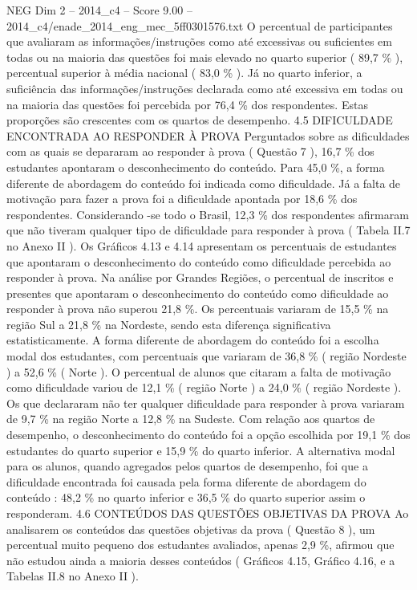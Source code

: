 \begin{textsample}{NEG Dim 2 – 2014\_c4 – Score 9.00 – 2014\_c4/enade\_2014\_eng\_mec\_5ff0301576.txt}
O percentual de participantes que avaliaram as informações/instruções como até excessivas ou suficientes em todas ou na maioria das questões foi mais elevado no quarto superior ( 89,7 \% ), percentual superior à média nacional ( 83,0 \% ).
Já no quarto inferior, a suficiência das informações/instruções declarada como até excessiva em todas ou na maioria das questões foi percebida por 76,4 \% dos respondentes.
Estas proporções são crescentes com os quartos de desempenho. 4.5 DIFICULDADE ENCONTRADA AO RESPONDER À PROVA Perguntados sobre as dificuldades com as quais se depararam ao responder à prova ( Questão 7 ), 16,7 \% dos estudantes apontaram o desconhecimento do conteúdo.
Para 45,0 \%, a forma diferente de abordagem do conteúdo foi indicada como dificuldade.
Já a falta de motivação para fazer a prova foi a dificuldade apontada por 18,6 \% dos respondentes.
Considerando -se todo o Brasil, 12,3 \% dos respondentes afirmaram que não tiveram qualquer tipo de dificuldade para responder à prova ( Tabela II.7 no Anexo II ).
Os Gráficos 4.13 e 4.14 apresentam os percentuais de estudantes que apontaram o desconhecimento do conteúdo como dificuldade percebida ao responder à prova.
Na análise por Grandes Regiões, o percentual de inscritos e presentes que apontaram o desconhecimento do conteúdo como dificuldade ao responder à prova não superou 21,8 \%.
Os percentuais variaram de 15,5 \% na região Sul a 21,8 \% na Nordeste, sendo esta diferença significativa estatisticamente.
A forma diferente de abordagem do conteúdo foi a escolha modal dos estudantes, com percentuais que variaram de 36,8 \% ( região Nordeste ) a 52,6 \% ( Norte ).
O percentual de alunos que citaram a falta de motivação como dificuldade variou de 12,1 \% ( região Norte ) a 24,0 \% ( região Nordeste ).
Os que declararam não ter qualquer dificuldade para responder à prova variaram de 9,7 \% na região Norte a 12,8 \% na Sudeste.
Com relação aos quartos de desempenho, o desconhecimento do conteúdo foi a opção escolhida por 19,1 \% dos estudantes do quarto superior e 15,9 \% do quarto inferior.
A alternativa modal para os alunos, quando agregados pelos quartos de desempenho, foi que a dificuldade encontrada foi causada pela forma diferente de abordagem do conteúdo : 48,2 \% no quarto inferior e 36,5 \% do quarto superior assim o responderam. 4.6 CONTEÚDOS DAS QUESTÕES OBJETIVAS DA PROVA Ao analisarem os conteúdos das questões objetivas da prova ( Questão 8 ), um percentual muito pequeno dos estudantes avaliados, apenas 2,9 \%, afirmou que não estudou ainda a maioria desses conteúdos ( Gráficos 4.15, Gráfico 4.16, e a Tabelas II.8 no Anexo II ).

\end{textsample}
